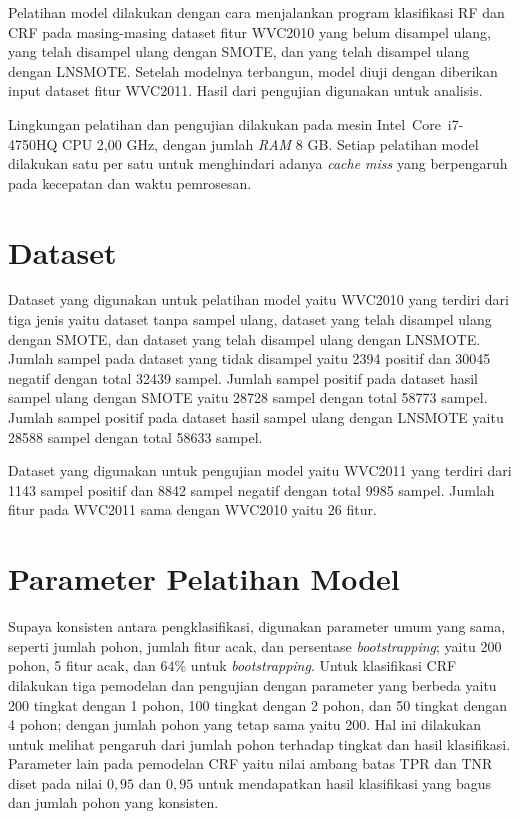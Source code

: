 Pelatihan model dilakukan dengan cara menjalankan program klasifikasi RF dan
CRF pada masing-masing dataset fitur WVC2010 yang belum disampel ulang, yang
telah disampel ulang dengan SMOTE, dan yang telah disampel ulang dengan
LNSMOTE.
Setelah modelnya terbangun, model diuji dengan diberikan input dataset fitur
WVC2011. Hasil dari pengujian digunakan untuk analisis.

Lingkungan pelatihan dan pengujian dilakukan pada mesin Intel\textregistered\
 Core\texttrademark \ i7-4750HQ CPU 2,00 GHz, dengan jumlah \textit{RAM} 8
GB. Setiap pelatihan model dilakukan satu per satu untuk menghindari adanya
\textit{cache miss} yang berpengaruh pada kecepatan dan waktu pemrosesan.

\section{Dataset}

Dataset yang digunakan untuk pelatihan model yaitu WVC2010 yang terdiri dari
tiga jenis yaitu dataset tanpa sampel ulang, dataset yang telah disampel ulang
dengan SMOTE, dan dataset yang telah disampel ulang dengan LNSMOTE.
Jumlah sampel pada dataset yang tidak disampel yaitu 2394 positif dan 30045
negatif dengan total 32439 sampel.
Jumlah sampel positif pada dataset hasil sampel ulang dengan SMOTE yaitu 28728
sampel dengan total 58773 sampel.
Jumlah sampel positif pada dataset hasil sampel ulang dengan LNSMOTE yaitu
28588 sampel dengan total 58633 sampel.

Dataset yang digunakan untuk pengujian model yaitu WVC2011 yang terdiri dari
1143 sampel positif dan 8842 sampel negatif dengan total 9985 sampel.
Jumlah fitur pada WVC2011 sama dengan WVC2010 yaitu 26 fitur.

\section{Parameter Pelatihan Model}

Supaya konsisten antara pengklasifikasi, digunakan parameter umum yang sama,
seperti jumlah pohon, jumlah fitur acak, dan persentase \textit{bootstrapping};
yaitu 200 pohon, 5 fitur acak, dan $ 64\% $ untuk \textit{bootstrapping}.
Untuk klasifikasi CRF dilakukan tiga pemodelan dan pengujian dengan parameter
yang berbeda yaitu 200 tingkat dengan 1 pohon, 100 tingkat dengan 2 pohon, dan
50 tingkat dengan 4 pohon; dengan jumlah pohon yang tetap sama yaitu 200.
Hal ini dilakukan untuk melihat pengaruh dari jumlah pohon terhadap tingkat dan
hasil klasifikasi.
Parameter lain pada pemodelan CRF yaitu nilai ambang batas TPR dan TNR diset
pada nilai $0,95$ dan $0,95$ untuk mendapatkan hasil klasifikasi yang bagus dan
jumlah pohon yang konsisten.

